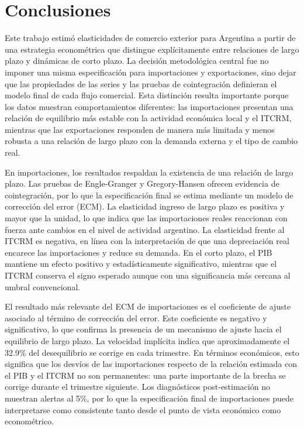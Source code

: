 \documentclass[11pt]{article}
\begin{document}
\section{Conclusiones}
\label{sec:conclusiones}

Este trabajo estimó elasticidades de comercio exterior para Argentina a partir
de una estrategia econométrica que distingue explícitamente entre relaciones de
largo plazo y dinámicas de corto plazo. La decisión metodológica central fue no
imponer una misma especificación para importaciones y exportaciones, sino dejar
que las propiedades de las series y las pruebas de cointegración definieran el
modelo final de cada flujo comercial. Esta distinción resulta importante porque
los datos muestran comportamientos diferentes: las importaciones presentan una
relación de equilibrio más estable con la actividad económica local y el ITCRM,
mientras que las exportaciones responden de manera más limitada y menos robusta
a una relación de largo plazo con la demanda externa y el tipo de cambio real.

En importaciones, los resultados respaldan la existencia de una relación de
largo plazo. Las pruebas de Engle-Granger y Gregory-Hansen ofrecen evidencia de
cointegración, por lo que la especificación final se estima mediante un modelo
de corrección del error (ECM). La elasticidad ingreso de largo plazo es positiva
y mayor que la unidad, lo que indica que las importaciones reales reaccionan con
fuerza ante cambios en el nivel de actividad argentino. La elasticidad frente al
ITCRM es negativa, en línea con la interpretación de que una depreciación real
encarece las importaciones y reduce su demanda. En el corto plazo, el PIB
mantiene un efecto positivo y estadísticamente significativo, mientras que el
ITCRM conserva el signo esperado aunque con una significancia más cercana al
umbral convencional.

El resultado más relevante del ECM de importaciones es el coeficiente de ajuste
asociado al término de corrección del error. Este coeficiente es negativo y
significativo, lo que confirma la presencia de un mecanismo de ajuste hacia el
equilibrio de largo plazo. La velocidad implícita indica que aproximadamente el
32.9\% del desequilibrio se corrige en cada trimestre. En términos económicos,
esto significa que los desvíos de las importaciones respecto de la relación
estimada con el PIB y el ITCRM no son permanentes: una parte importante de la
brecha se corrige durante el trimestre siguiente. Los diagnósticos
post-estimación no muestran alertas al 5\%, por lo que la especificación final
de importaciones puede interpretarse como consistente tanto desde el punto de
vista económico como econométrico.
\end{document}
